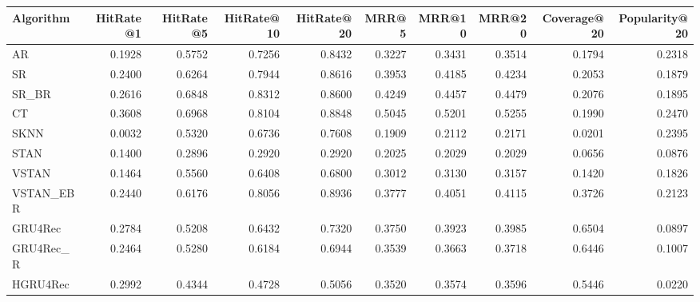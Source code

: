 \begin{tabular}{lrrrrrrrrr}
\toprule
 Algorithm &  HitRate@1 &  HitRate@5 &  HitRate@10 &  HitRate@20 &   MRR@5 &  MRR@10 &  MRR@20 &  Coverage@20 &  Popularity@20 \\
\midrule
        AR &     0.1928 &     0.5752 &      0.7256 &      0.8432 &  0.3227 &  0.3431 &  0.3514 &       0.1794 &         0.2318 \\
        SR &     0.2400 &     0.6264 &      0.7944 &      0.8616 &  0.3953 &  0.4185 &  0.4234 &       0.2053 &         0.1879 \\
     SR\_BR &     0.2616 &     0.6848 &      0.8312 &      0.8600 &  0.4249 &  0.4457 &  0.4479 &       0.2076 &         0.1895 \\
        CT &     0.3608 &     0.6968 &      0.8104 &      0.8848 &  0.5045 &  0.5201 &  0.5255 &       0.1990 &         0.2470 \\
      SKNN &     0.0032 &     0.5320 &      0.6736 &      0.7608 &  0.1909 &  0.2112 &  0.2171 &       0.0201 &         0.2395 \\
      STAN &     0.1400 &     0.2896 &      0.2920 &      0.2920 &  0.2025 &  0.2029 &  0.2029 &       0.0656 &         0.0876 \\
     VSTAN &     0.1464 &     0.5560 &      0.6408 &      0.6800 &  0.3012 &  0.3130 &  0.3157 &       0.1420 &         0.1826 \\
 VSTAN\_EBR &     0.2440 &     0.6176 &      0.8056 &      0.8936 &  0.3777 &  0.4051 &  0.4115 &       0.3726 &         0.2123 \\
   GRU4Rec &     0.2784 &     0.5208 &      0.6432 &      0.7320 &  0.3750 &  0.3923 &  0.3985 &       0.6504 &         0.0897 \\
 GRU4Rec\_R &     0.2464 &     0.5280 &      0.6184 &      0.6944 &  0.3539 &  0.3663 &  0.3718 &       0.6446 &         0.1007 \\
  HGRU4Rec &     0.2992 &     0.4344 &      0.4728 &      0.5056 &  0.3520 &  0.3574 &  0.3596 &       0.5446 &         0.0220 \\
\bottomrule
\end{tabular}

